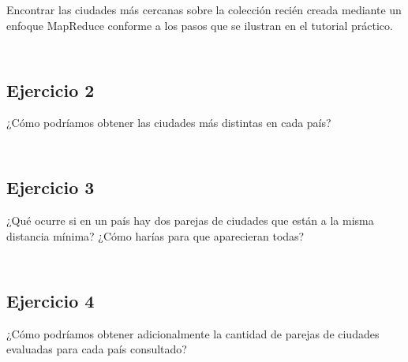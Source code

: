 Encontrar las ciudades más cercanas sobre la colección recién creada mediante un enfoque MapReduce conforme a los pasos que se ilustran en el tutorial práctico.

\begin{lstlisting}

\end{lstlisting}

\begin{lstlisting}

\end{lstlisting}

\subsection{Ejercicio 2}

¿Cómo podríamos obtener las ciudades más distintas en cada país?

\begin{lstlisting}

\end{lstlisting}

\begin{lstlisting}

\end{lstlisting}

\subsection{Ejercicio 3}

¿Qué ocurre si en un país hay dos parejas de ciudades que están a la misma distancia mínima? ¿Cómo harías para que aparecieran todas?

\begin{lstlisting}

\end{lstlisting}

\begin{lstlisting}

\end{lstlisting}

\subsection{Ejercicio 4}

¿Cómo podríamos obtener adicionalmente la cantidad de parejas de ciudades evaluadas para cada país consultado?

\begin{lstlisting}

\end{lstlisting}

